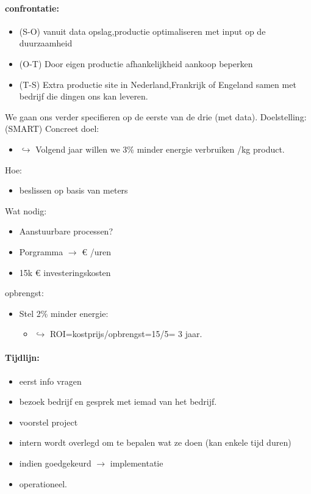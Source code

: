 \documentclass[12pt]{article}
\begin{document}
\paragraph{confrontatie:}
\begin{itemize}
    \item (S-O) vanuit data opslag,productie optimaliseren met input op de duurzaamheid 
    \item (O-T) Door eigen productie afhankelijkheid aankoop beperken
    \item (T-S) Extra productie site in Nederland,Frankrijk of Engeland samen met bedrijf die dingen ons kan leveren.
\end{itemize}
We gaan ons verder specifieren op de eerste van de drie (met data).
Doelstelling:(SMART)\newline
Concreet doel:\begin{itemize}
    \item $\hookrightarrow$ Volgend jaar willen we 3\% minder energie verbruiken /kg product.
\end{itemize}
Hoe:\begin{itemize}
    \item beslissen op basis van meters
\end{itemize}
Wat nodig:\begin{itemize}
    \item Aanstuurbare processen?
    \item Porgramma $\rightarrow$ € /uren 
    \item 15k € investeringskosten
\end{itemize}
opbrengst:\begin{itemize}
    \item Stel 2\% minder energie:\begin{itemize}
        \item $\hookrightarrow$ ROI=kostprijs/opbrengst=15/5= 3 jaar.
    \end{itemize}
\end{itemize}
\paragraph{Tijdlijn:}
\begin{itemize}
    \item eerst info vragen 
    \item bezoek bedrijf en gesprek met iemad van het bedrijf.
    \item voorstel project 
    \item intern wordt overlegd om te bepalen wat ze doen (kan enkele tijd duren)
    \item indien goedgekeurd $\rightarrow$ implementatie 
    \item operationeel.
\end{itemize}
\end{document}
